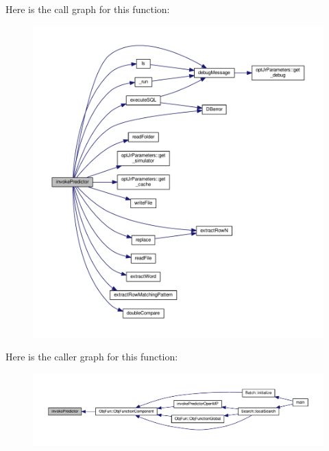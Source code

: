 Here is the call graph for this function\-:\nopagebreak
\begin{figure}[H]
\begin{center}
\leavevmode
\includegraphics[width=350pt]{invokePredictor_8hh_a342ccdfe7923368e52a4894d69c7455a_cgraph}
\end{center}
\end{figure}




Here is the caller graph for this function\-:\nopagebreak
\begin{figure}[H]
\begin{center}
\leavevmode
\includegraphics[width=350pt]{invokePredictor_8hh_a342ccdfe7923368e52a4894d69c7455a_icgraph}
\end{center}
\end{figure}


